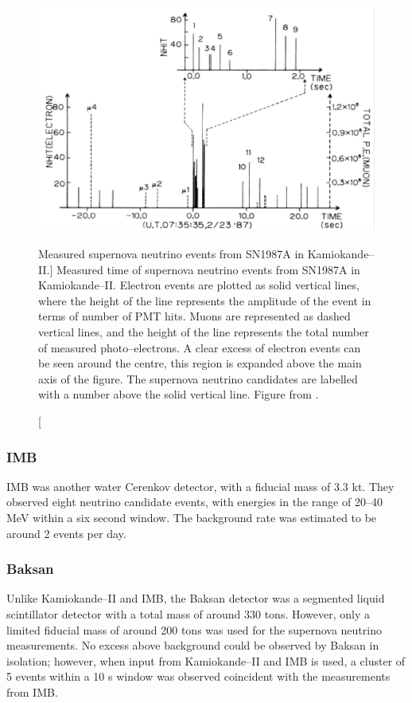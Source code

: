 \begin{figure}
	\centering
	\includegraphics{figures/kami_1987.pdf}
	\caption
	[Measured supernova neutrino events from SN1987A in Kamiokande--II.]
	{Measured time of supernova neutrino events from SN1987A in Kamiokande--II. 
	Electron events are plotted as solid vertical lines, where the height of the 
	line represents the amplitude of the event in terms of number of PMT hits. 
	Muons are represented as dashed vertical lines, and the height of the line 
	represents the total number of measured photo--electrons. A clear excess of 
	electron events can be seen around the centre, this region is expanded above 
	the main axis of the figure. The supernova neutrino candidates are labelled
	with a number above the solid vertical line. Figure from 
	\cite{Hirata:1987hu}.}
	\label{fig:kami_1987}
\end{figure}

\subsubsection{IMB}
IMB was another water Cerenkov detector, with a fiducial mass of 3.3 kt. They
observed eight neutrino candidate events, with energies in the range of 20--40
MeV within a six second window. The background rate was estimated to be around 2
events per day\cite{PhysRevLett.58.1494}.

\subsubsection{Baksan}
Unlike Kamiokande--II and IMB, the Baksan detector was a segmented liquid
scintillator detector with a total mass of around 330 tons. However, only a
limited fiducial mass of around 200 tons was used for the supernova neutrino
measurements. No excess above background could be observed by Baksan
in isolation; however, when input from Kamiokande--II and IMB is used, a 
cluster of 5 events within a 10 s window was observed coincident with the 
measurements from IMB\cite{Loredo:2001rx}.

